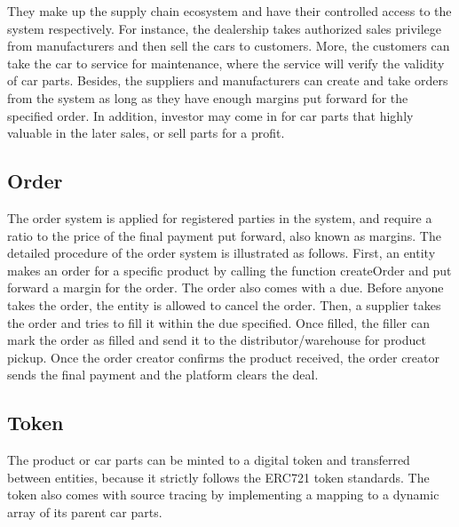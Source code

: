 \documentclass[12pt]{article}
\begin{document}
They make up the supply chain ecosystem and have their controlled access to the system respectively. For instance, the dealership takes authorized sales privilege from manufacturers and then sell the cars to customers. More, the customers can take the car to service for maintenance, where the service will verify the validity of car parts. Besides, the suppliers and manufacturers can create and take orders from the system as long as they have enough margins put forward for the specified order. In addition, investor may come in for car parts that highly valuable in the later sales, or sell parts for a profit.

\subsection{Order}
The order system is applied for registered parties in the system, and require a ratio to the price of the final payment put forward, also known as margins. The detailed procedure of the order system is illustrated as follows. First, an entity makes an order for a specific product by calling the function createOrder and put forward a margin for the order. The order also comes with a due. Before anyone takes the order, the entity is allowed to cancel the order. Then, a supplier takes the order and tries to fill it within the due specified. Once filled, the filler can mark the order as filled and send it to the distributor/warehouse for product pickup. Once the order creator confirms the product received, the order creator sends the final payment and the platform clears the deal.

\subsection{Token}
The product or car parts can be minted to a digital token and transferred between entities, because it strictly follows the ERC721 token standards. The token also comes with source tracing by implementing a mapping to a dynamic array of its parent car parts.

%
\end{document}
